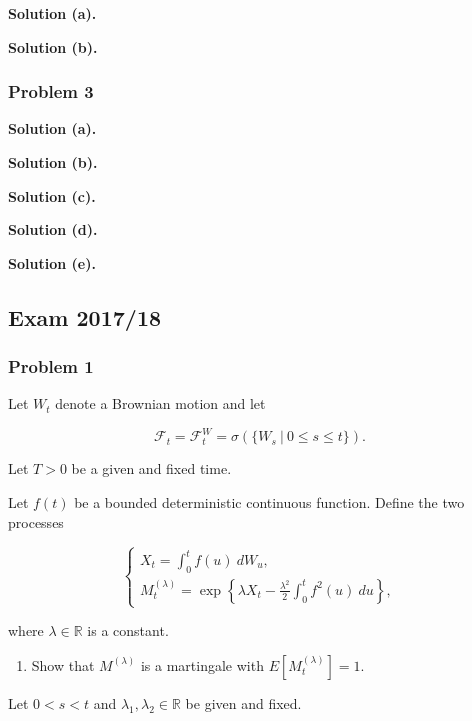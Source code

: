 \documentclass[
]{article}
\providecommand{\tightlist}{%
  \setlength{\itemsep}{0pt}\setlength{\parskip}{0pt}}
\begin{document}
\textbf{Solution (a).}

\textbf{Solution (b).}

\hypertarget{problem-3}{%
\subsubsection{Problem 3}\label{problem-3}}

\textbf{Solution (a).}

\textbf{Solution (b).}

\textbf{Solution (c).}

\textbf{Solution (d).}

\textbf{Solution (e).}

\hypertarget{exam-201718}{%
\subsection{Exam 2017/18}\label{exam-201718}}

\hypertarget{problem-1}{%
\subsubsection{Problem 1}\label{problem-1}}

Let \(W_t\) denote a Brownian motion and let

\[
\mathcal{F}_t=\mathcal{F}_t^W=\sigma(\{W_s\ \vert\ 0\le s\le t\}).
\]

Let \(T>0\) be a given and fixed time.

Let \(f(t)\) be a bounded deterministic continuous function. Define the
two processes

\[
\begin{cases}
X_t=\int_0^tf(u)\ dW_u,\\
M^{(\lambda)}_t=\exp\left\{\lambda X_t-\frac{\lambda^2}{2}\int_0^t f^2(u)\ du\right\},
\end{cases}
\]

where \(\lambda\in\mathbb{R}\) is a constant.

\begin{enumerate}
\def\labelenumi{\alph{enumi}.}
\tightlist
\item
  Show that \(M^{(\lambda)}\) is a martingale with
  \(E[M_t^{(\lambda)}]=1\).
\end{enumerate}

Let \(0<s<t\) and \(\lambda_1,\lambda_2\in \mathbb{R}\) be given and
fixed.
\end{document}
